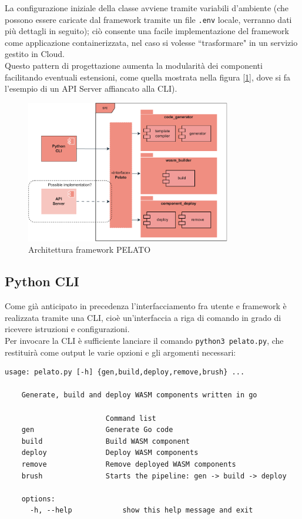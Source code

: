 La configurazione iniziale della classe avviene tramite variabili d'ambiente (che possono essere caricate dal framework tramite un file \texttt{.env} locale, verranno dati più dettagli in seguito); ciò consente una facile implementazione del framework come applicazione containerizzata, nel caso si volesse ``trasformare" in un servizio gestito in Cloud.\\
Questo pattern di progettazione aumenta la modularità dei componenti facilitando eventuali estensioni, come quella mostrata nella figura [\ref{fig:pelato_architecture}], dove si fa l'esempio di un API Server affiancato alla CLI).\\

\FloatBarrier
\begin{figure}[h]
    \centering
    \includegraphics[width=0.8\textwidth]{img/schemi/schemi-implementazione-struttura.drawio.pdf}
    \caption{Architettura framework PELATO}
    \label{fig:pelato_architecture}
\end{figure}
\FloatBarrier

\subsection{Python CLI}

Come già anticipato in precedenza l'interfacciamento fra utente e framework è realizzata tramite una CLI, cioè un'interfaccia a riga di comando in grado di ricevere istruzioni e configurazioni.\\
Per invocare la CLI è sufficiente lanciare il comando \lstinline{python3 pelato.py}, che restituirà come output le varie opzioni e gli argomenti necessari:\\
\begin{lstlisting}[caption={Output Pelato CLI}, captionpos=b, label={code:pelato_cli}]
    usage: pelato.py [-h] {gen,build,deploy,remove,brush} ...

    Generate, build and deploy WASM components written in go
    
                        Command list
    gen                 Generate Go code
    build               Build WASM component
    deploy              Deploy WASM components
    remove              Remove deployed WASM components
    brush               Starts the pipeline: gen -> build -> deploy

    options:
      -h, --help            show this help message and exit
\end{lstlisting}

